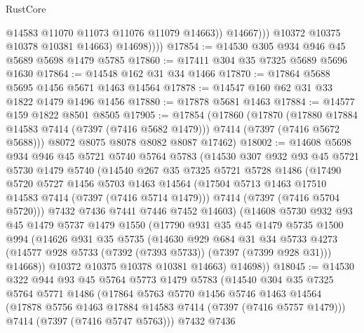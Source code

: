 \begin{lexlean}{RustCore}
\begin{coremodule}
                        @14583
                        @11070
                        @11073
                        @11076
                        @11079
                        @14663))
                    @14667)))
              @10372
              @10375
              @10378
              @10381
              @14663)
            @14698))))
@17854 := @14530 @305 @934 @946 @45 @5689 @5698 @1479 @5785
@17860 := @17411 @304 @35 @7325 @5689 @5696 @1630
@17864 := @14548 @162 @31 @34 @1466
@17870 := @17864 @5688 @5695 @1456 @5671 @1463 @14564
@17878 := @14547 @160 @62 @31 @33 @1822 @1479 @1496 @1456
@17880 := @17878 @5681 @1463
@17884 := @14577 @159 @1822 @8501 @8505
@17905 := @17854
    (@17860
      (@17870
        (@17880 @17884 @14583 @7414 (@7397 (@7416 @5682 @1479)))
        @7414
        (@7397 (@7416 @5672 @5688)))
      @8072
      @8075
      @8078
      @8082
      @8087
      @17462)
@18002 := @14608
    @5698
    @934
    @946
    @45
    @5721
    @5740
    @5764
    @5783
    (@14530
      @307
      @932
      @93
      @45
      @5721
      @5730
      @1479
      @5740
      (@14540
        @267
        @35
        @7325
        @5721
        @5728
        @1486
        (@17490
          @5720
          @5727
          @1456
          @5703
          @1463
          @14564
          (@17504 @5713 @1463 @17510 @14583 @7414 (@7397 (@7416 @5714 @1479)))
          @7414
          (@7397 (@7416 @5704 @5720)))
        @7432
        @7436
        @7441
        @7446
        @7452
        @14603)
      (@14608
        @5730
        @932
        @93
        @45
        @1479
        @5737
        @1479
        @1550
        (@17790
          @931
          @35
          @45
          @1479
          @5735
          @1500
          @994
          (@14626
            @931
            @35
            @5735
            (@14630
              @929
              @684
              @31
              @34
              @5733
              @4273
              (@14577 @928 @5733 (@7392 (@7393 @5733)) (@7397 (@7399 @928 @31)))
              @14668))
          @10372
          @10375
          @10378
          @10381
          @14663)
        @14698))
@18045 := @14530
    @322
    @944
    @93
    @45
    @5764
    @5773
    @1479
    @5783
    (@14540
      @304
      @35
      @7325
      @5764
      @5771
      @1486
      (@17864
        @5763
        @5770
        @1456
        @5746
        @1463
        @14564
        (@17878 @5756 @1463 @17884 @14583 @7414 (@7397 (@7416 @5757 @1479)))
        @7414
        (@7397 (@7416 @5747 @5763)))
      @7432
      @7436

\end{coremodule}
\end{lexlean}
